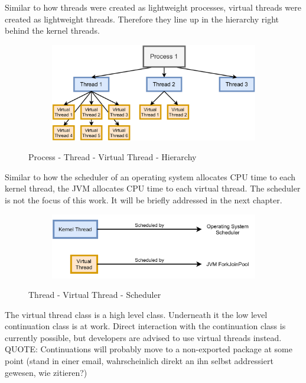 Similar to how threads were created as lightweight processes, virtual threads were created as lightweight threads. Therefore they line up in the hierarchy right behind the kernel threads.
\begin{figure}[H]
    \centering
    \begin{subfigure}[b]{1.0\textwidth}
        \includegraphics[width=1.0\linewidth]{img/process-thread-vthread.png}
    \end{subfigure}
    \caption{Process - Thread - Virtual Thread - Hierarchy}
    \label{Process - Thread - Virtual Thread - Hierarchy}
\end{figure}
Similar to how the scheduler of an operating system allocates CPU time to each kernel thread, the JVM allocates CPU time to each virtual thread. The scheduler is not the focus of this work. It will be briefly addressed in the next chapter.
\begin{figure}[H]
    \centering
    \begin{subfigure}[b]{1.0\textwidth}
        \includegraphics[width=1.0\linewidth]{img/thread-vthread-scheduler.png}
    \end{subfigure}
    \caption{Thread - Virtual Thread - Scheduler}
    \label{Thread - Virtual Thread - Scheduler}
\end{figure}
The virtual thread class is a high level class. Underneath it the low level continuation class is at work. Direct interaction with the continuation class is currently possible, but developers are advised to use virtual threads instead. QUOTE: Continuations will probably move to a non-exported package at some point (stand in einer email, wahrscheinlich direkt an ihn selbst addressiert gewesen, wie zitieren?)





